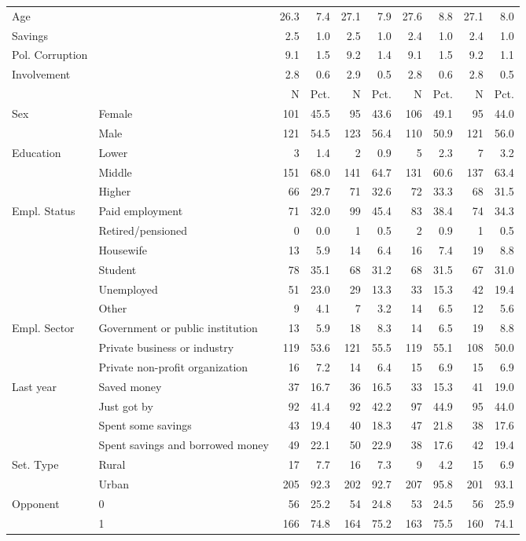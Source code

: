 \begin{table}
\begin{tabular}[t]{llrrrrrrrr}
Age &  & 26.3 & 7.4 & 27.1 & 7.9 & 27.6 & 8.8 & 27.1 & 8.0\\
Savings &  & 2.5 & 1.0 & 2.5 & 1.0 & 2.4 & 1.0 & 2.4 & 1.0\\
Pol. Corruption &  & 9.1 & 1.5 & 9.2 & 1.4 & 9.1 & 1.5 & 9.2 & 1.1\\
Involvement &  & 2.8 & 0.6 & 2.9 & 0.5 & 2.8 & 0.6 & 2.8 & 0.5\\
\midrule
 &  & N & Pct. & N & Pct. & N & Pct. & N & Pct.\\
Sex & Female & 101 & 45.5 & 95 & 43.6 & 106 & 49.1 & 95 & 44.0\\
 & Male & 121 & 54.5 & 123 & 56.4 & 110 & 50.9 & 121 & 56.0\\
Education & Lower & 3 & 1.4 & 2 & 0.9 & 5 & 2.3 & 7 & 3.2\\
 & Middle & 151 & 68.0 & 141 & 64.7 & 131 & 60.6 & 137 & 63.4\\
 & Higher & 66 & 29.7 & 71 & 32.6 & 72 & 33.3 & 68 & 31.5\\
Empl. Status & Paid employment & 71 & 32.0 & 99 & 45.4 & 83 & 38.4 & 74 & 34.3\\
 & Retired/pensioned & 0 & 0.0 & 1 & 0.5 & 2 & 0.9 & 1 & 0.5\\
 & Housewife & 13 & 5.9 & 14 & 6.4 & 16 & 7.4 & 19 & 8.8\\
 & Student & 78 & 35.1 & 68 & 31.2 & 68 & 31.5 & 67 & 31.0\\
 & Unemployed & 51 & 23.0 & 29 & 13.3 & 33 & 15.3 & 42 & 19.4\\
 & Other & 9 & 4.1 & 7 & 3.2 & 14 & 6.5 & 12 & 5.6\\
Empl. Sector & Government or public institution & 13 & 5.9 & 18 & 8.3 & 14 & 6.5 & 19 & 8.8\\
 & Private business or industry & 119 & 53.6 & 121 & 55.5 & 119 & 55.1 & 108 & 50.0\\
 & Private non-profit organization & 16 & 7.2 & 14 & 6.4 & 15 & 6.9 & 15 & 6.9\\
Last year & Saved money & 37 & 16.7 & 36 & 16.5 & 33 & 15.3 & 41 & 19.0\\
 & Just got by & 92 & 41.4 & 92 & 42.2 & 97 & 44.9 & 95 & 44.0\\
 & Spent some savings & 43 & 19.4 & 40 & 18.3 & 47 & 21.8 & 38 & 17.6\\
 & Spent savings and
borrowed money & 49 & 22.1 & 50 & 22.9 & 38 & 17.6 & 42 & 19.4\\
Set. Type & Rural & 17 & 7.7 & 16 & 7.3 & 9 & 4.2 & 15 & 6.9\\
 & Urban & 205 & 92.3 & 202 & 92.7 & 207 & 95.8 & 201 & 93.1\\
Opponent & 0 & 56 & 25.2 & 54 & 24.8 & 53 & 24.5 & 56 & 25.9\\
 & 1 & 166 & 74.8 & 164 & 75.2 & 163 & 75.5 & 160 & 74.1\\
\bottomrule
\end{tabular}
\end{table}
